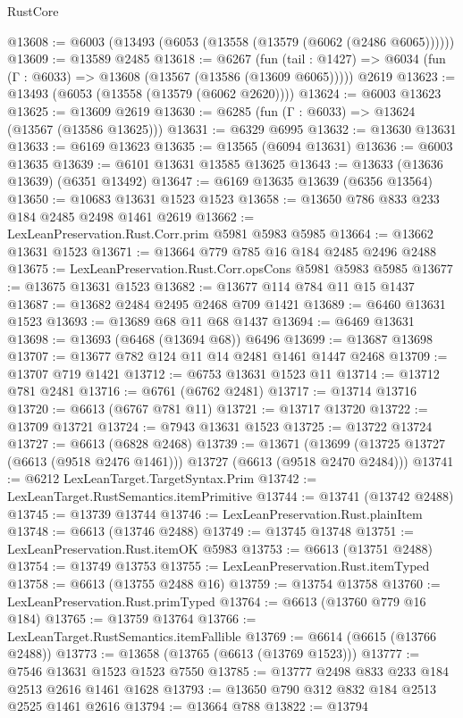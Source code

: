 \begin{lexlean}{RustCore}
\begin{coremodule}
@13608 := @6003 (@13493 (@6053 (@13558 (@13579 (@6062 (@2486 @6065))))))
@13609 := @13589 @2485
@13618 := @6267
    (fun (tail : @1427) => @6034 (fun (Γ : @6033) => @13608 (@13567 (@13586 (@13609 @6065)))))
    @2619
@13623 := @13493 (@6053 (@13558 (@13579 (@6062 @2620))))
@13624 := @6003 @13623
@13625 := @13609 @2619
@13630 := @6285 (fun (Γ : @6033) => @13624 (@13567 (@13586 @13625)))
@13631 := @6329 @6995
@13632 := @13630 @13631
@13633 := @6169 @13623
@13635 := @13565 (@6094 @13631)
@13636 := @6003 @13635
@13639 := @6101 @13631 @13585 @13625
@13643 := @13633 (@13636 @13639) (@6351 @13492)
@13647 := @6169 @13635 @13639 (@6356 @13564)
@13650 := @10683 @13631 @1523 @1523
@13658 := @13650 @786 @833 @233 @184 @2485 @2498 @1461 @2619
@13662 := LexLeanPreservation.Rust.Corr.prim @5981 @5983 @5985
@13664 := @13662 @13631 @1523
@13671 := @13664 @779 @785 @16 @184 @2485 @2496 @2488
@13675 := LexLeanPreservation.Rust.Corr.opsCons @5981 @5983 @5985
@13677 := @13675 @13631 @1523
@13682 := @13677 @114 @784 @11 @15 @1437
@13687 := @13682 @2484 @2495 @2468 @709 @1421
@13689 := @6460 @13631 @1523
@13693 := @13689 @68 @11 @68 @1437
@13694 := @6469 @13631
@13698 := @13693 (@6468 (@13694 @68)) @6496
@13699 := @13687 @13698
@13707 := @13677 @782 @124 @11 @14 @2481 @1461 @1447 @2468
@13709 := @13707 @719 @1421
@13712 := @6753 @13631 @1523 @11
@13714 := @13712 @781 @2481
@13716 := @6761 (@6762 @2481)
@13717 := @13714 @13716
@13720 := @6613 (@6767 @781 @11)
@13721 := @13717 @13720
@13722 := @13709 @13721
@13724 := @7943 @13631 @1523
@13725 := @13722 @13724
@13727 := @6613 (@6828 @2468)
@13739 := @13671
    (@13699 (@13725 @13727 (@6613 (@9518 @2476 @1461))) @13727 (@6613 (@9518 @2470 @2484)))
@13741 := @6212 LexLeanTarget.TargetSyntax.Prim
@13742 := LexLeanTarget.RustSemantics.itemPrimitive
@13744 := @13741 (@13742 @2488)
@13745 := @13739 @13744
@13746 := LexLeanPreservation.Rust.plainItem
@13748 := @6613 (@13746 @2488)
@13749 := @13745 @13748
@13751 := LexLeanPreservation.Rust.itemOK @5983
@13753 := @6613 (@13751 @2488)
@13754 := @13749 @13753
@13755 := LexLeanPreservation.Rust.itemTyped
@13758 := @6613 (@13755 @2488 @16)
@13759 := @13754 @13758
@13760 := LexLeanPreservation.Rust.primTyped
@13764 := @6613 (@13760 @779 @16 @184)
@13765 := @13759 @13764
@13766 := LexLeanTarget.RustSemantics.itemFallible
@13769 := @6614 (@6615 (@13766 @2488))
@13773 := @13658 (@13765 (@6613 (@13769 @1523)))
@13777 := @7546 @13631 @1523 @1523 @7550
@13785 := @13777 @2498 @833 @233 @184 @2513 @2616 @1461 @1628
@13793 := @13650 @790 @312 @832 @184 @2513 @2525 @1461 @2616
@13794 := @13664 @788
@13822 := @13794

\end{coremodule}
\end{lexlean}
